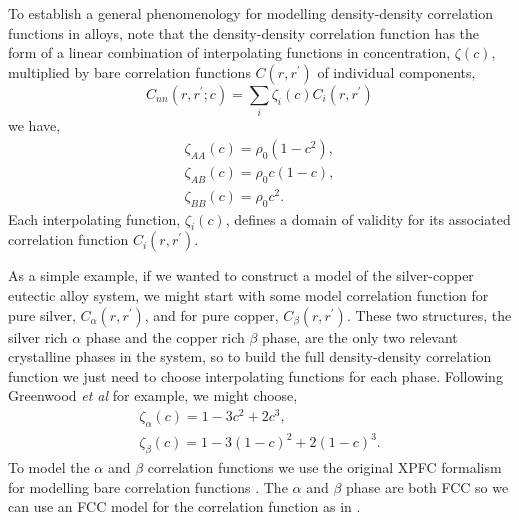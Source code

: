 \section{ } %

To establish a general phenomenology for modelling density-density correlation
functions in alloys, note that the density-density correlation function has the form of a
linear combination of interpolating functions in concentration, $\zeta(c)$,
multiplied by bare correlation functions $C(r, r^\prime)$ of individual components,
%
\begin{equation}
    C_{nn}(r, r^\prime; c) = \sum_i \zeta_i(c) C_i(r, r^\prime)
\end{equation}
%
 we have,
%
\begin{gather}
    \zeta_{AA}(c) = \rho_0 (1 - c^2), \\
    \zeta_{AB}(c) = \rho_0 c (1 - c ), \\
    \zeta_{BB}(c) = \rho_0 c^2.
\end{gather}
%
Each interpolating function, $\zeta_i(c)$, defines a domain of validity for its
associated correlation function $C_i(r, r^\prime)$. 

As a simple example, if we wanted to construct a model of the
silver-copper eutectic alloy system, we might start with some model correlation
function for pure silver, $C_\alpha(r, r^\prime)$, and for pure copper,
$C_\beta(r, r^\prime)$. These two structures, the silver rich $\alpha$ phase
and the copper rich $\beta$ phase, are the only two relevant crystalline
phases in the system, so to build the full density-density correlation
function we just need to choose interpolating functions for each phase. Following
Greenwood \textit{et al} for example, we might choose,
%
\begin{gather}
    \zeta_\alpha(c) = 1 - 3c^2 + 2c^3, \\
    \zeta_\beta(c) = 1 - 3 (1 - c)^2 + 2(1 - c)^3.
\end{gather}
%
To model the $\alpha$ and $\beta$ correlation functions we use the original
XPFC formalism for modelling bare correlation functions . The $\alpha$ and
$\beta$ phase are both FCC \cite{SUBRAMANIAN93} so we can use an FCC model for
the correlation function as in \cite{GREENWOOD10}.


